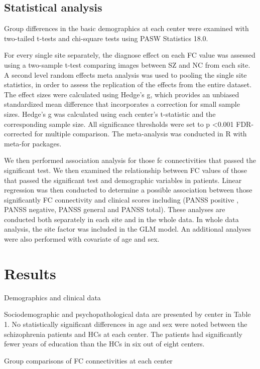 \documentclass[preprint,authoryear,review,12pt,times]{elsarticle}
\begin{document}
\subsection*{Statistical analysis}

Group differences in the basic demographics at each center were examined with two-tailed t-tests and chi-square tests using PASW Statistics 18.0.

For every single site separately, the diagnose effect on each FC value was assessed using a two-sample t-test comparing images between SZ and NC from each site. A second level random effects meta analysis was used to pooling the single site statistics, in order to assess the replication of the effects from the entire dataset. The effect sizes were calculated using Hedge’s g, which provides an unbiased standardized mean difference that incorporates a correction for small sample sizes. Hedge’s g was calculated using each center’s t-statistic and the corresponding sample size. All significance thresholds were set to p \textless 0.001 FDR-corrected for multiple comparison. The meta-analysis was conducted in R with meta-for packages.

We then performed association analysis for those fc connectivities that passed the significant test. We then examined the relationship between FC values of those that passed the significant test and demographic variables in patients.  Linear regression was then conducted to determine a possible association between those significantly FC connectivity and clinical scores including (PANSS positive , PANSS negative, PANSS general and PANSS total). These analyses are conducted both separately in each site and in the whole data. In whole data analysis, the site factor was included in the GLM model. An additional analyses were also performed with covariate of age and sex.

\section*{Results}

Demographics and clinical data

Sociodemographic and psychopathological data are presented by center in Table 1. No statistically significant differences in age and sex were noted between the schizophrenia patients and HCs at each center. The patients had significantly fewer years of education than the HCs in six out of eight centers.

Group comparisons of FC connectivities at each center
\end{document}

